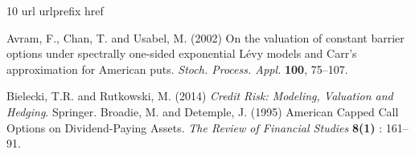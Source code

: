 \documentclass[10pt]{amsart}
\begin{document}
		
		\begin{thebibliography}{10}
			\expandafter\ifx\csname url\endcsname\relax
			\def\url#1{\texttt{#1}}\fi
			\expandafter\ifx\csname urlprefix\endcsname\relax\def\urlprefix{URL }\fi
			\expandafter\ifx\csname href\endcsname\relax
			\def\href#1#2{#2} \def\path#1{#1}\fi
			
			
			
			Avram, F., Chan, T.  and Usabel, M. (2002)
			On the valuation of constant barrier options under
			spectrally one-sided exponential L\'evy models and
			Carr’s approximation for American puts.
			{\it Stoch. Process. Appl.} {\bf 100}, 75–107.
			
			Bielecki, T.R. and Rutkowski, M. (2014)
			{\it Credit Risk: Modeling, Valuation and Hedging}.
			Springer.
			 Broadie, M. and Detemple, J. (1995) American Capped Call Options on Dividend-Paying Assets. {\it The Review of Financial Studies} {\bf 8(1)} : 161--91.
			

\end{thebibliography}
\end{document}
